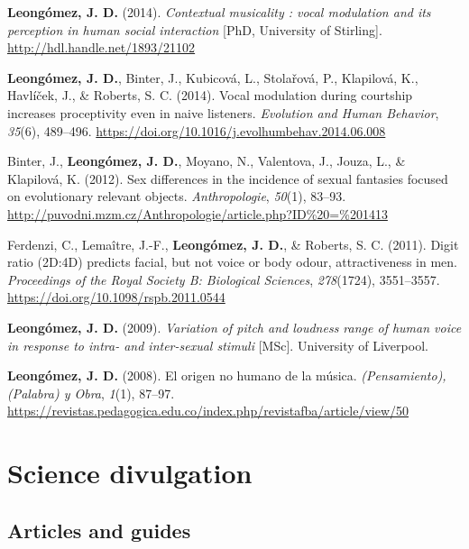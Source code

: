 \documentclass[11pt, a4paper]{awesome-cv}
\begin{document}
\leavevmode{}%
\textbf{Leongómez, J. D.} (2014). \emph{{Contextual musicality : vocal
modulation and its perception in human social interaction}} {[}PhD,
University of Stirling{]}. \url{http://hdl.handle.net/1893/21102}

\leavevmode{}%
\textbf{Leongómez, J. D.}, Binter, J., Kubicová, L., Stolařová, P.,
Klapilová, K., Havlíček, J., \& Roberts, S. C. (2014). {Vocal modulation
during courtship increases proceptivity even in naive listeners}.
\emph{Evolution and Human Behavior}, \emph{35}(6), 489--496.
\url{https://doi.org/10.1016/j.evolhumbehav.2014.06.008}

\leavevmode{}%
Binter, J., \textbf{Leongómez, J. D.}, Moyano, N., Valentova, J., Jouza,
L., \& Klapilová, K. (2012). {Sex differences in the incidence of sexual
fantasies focused on evolutionary relevant objects.}
\emph{Anthropologie}, \emph{50}(1), 83--93.
\url{http://puvodni.mzm.cz/Anthropologie/article.php?ID\%20=\%201413}

\leavevmode{}%
Ferdenzi, C., Lemaître, J.-F., \textbf{Leongómez, J. D.}, \& Roberts, S.
C. (2011). {Digit ratio (2D:4D) predicts facial, but not voice or body
odour, attractiveness in men.} \emph{Proceedings of the Royal Society B:
Biological Sciences}, \emph{278}(1724), 3551--3557.
\url{https://doi.org/10.1098/rspb.2011.0544}

\leavevmode{}%
\textbf{Leongómez, J. D.} (2009). \emph{{Variation of pitch and loudness
range of human voice in response to intra- and inter-sexual stimuli}}
{[}MSc{]}. University of Liverpool.

\leavevmode{}%
\textbf{Leongómez, J. D.} (2008). {El origen no humano de la m{ú}sica}.
\emph{(Pensamiento), (Palabra) y Obra}, \emph{1}(1), 87--97.
\url{https://revistas.pedagogica.edu.co/index.php/revistafba/article/view/50}

\endgroup

\hypertarget{science-divulgation}{%
\section{Science divulgation}\label{science-divulgation}}

\hypertarget{section-3}{%
\subsection{\texorpdfstring{\textbf{Articles and guides}}{}}\label{section-3}}
\end{document}
